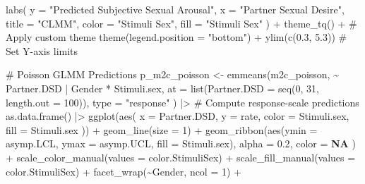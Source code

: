 \documentclass[
  bookmarksnumbered]{article}
\newenvironment{Shaded}{\begin{snugshade}}{\end{snugshade}}
\newcommand{\AttributeTok}[1]{\textcolor[rgb]{0.80,0.80,0.80}{#1}}
\newcommand{\CommentTok}[1]{\textcolor[rgb]{0.50,0.62,0.50}{#1}}
\newcommand{\ConstantTok}[1]{\textcolor[rgb]{0.86,0.64,0.64}{\textbf{#1}}}
\newcommand{\DecValTok}[1]{\textcolor[rgb]{0.86,0.86,0.80}{#1}}
\newcommand{\FloatTok}[1]{\textcolor[rgb]{0.75,0.75,0.82}{#1}}
\newcommand{\FunctionTok}[1]{\textcolor[rgb]{0.94,0.94,0.56}{#1}}
\newcommand{\NormalTok}[1]{\textcolor[rgb]{0.80,0.80,0.80}{#1}}
\newcommand{\OtherTok}[1]{\textcolor[rgb]{0.94,0.94,0.56}{#1}}
\newcommand{\SpecialCharTok}[1]{\textcolor[rgb]{0.86,0.64,0.64}{#1}}
\newcommand{\StringTok}[1]{\textcolor[rgb]{0.80,0.58,0.58}{#1}}
\begin{document}
\begin{Shaded}
\begin{Highlighting}[]
  \FunctionTok{labs}\NormalTok{(}
    \AttributeTok{y =} \StringTok{"Predicted Subjective Sexual Arousal"}\NormalTok{, }\AttributeTok{x =} \StringTok{"Partner Sexual Desire"}\NormalTok{,}
    \AttributeTok{title =} \StringTok{"CLMM"}\NormalTok{,}
    \AttributeTok{color =} \StringTok{"Stimuli Sex"}\NormalTok{, }\AttributeTok{fill =} \StringTok{"Stimuli Sex"}
\NormalTok{  ) }\SpecialCharTok{+}
  \FunctionTok{theme\_tq}\NormalTok{() }\SpecialCharTok{+} \CommentTok{\# Apply custom theme}
  \FunctionTok{theme}\NormalTok{(}\AttributeTok{legend.position =} \StringTok{"bottom"}\NormalTok{) }\SpecialCharTok{+}
  \FunctionTok{ylim}\NormalTok{(}\FunctionTok{c}\NormalTok{(}\FloatTok{0.3}\NormalTok{, }\FloatTok{5.3}\NormalTok{)) }\CommentTok{\# Set Y{-}axis limits}

\CommentTok{\# Poisson GLMM Predictions}
\NormalTok{p\_m2c\_poisson }\OtherTok{\textless{}{-}} \FunctionTok{emmeans}\NormalTok{(m2c\_poisson, }\SpecialCharTok{\textasciitilde{}}\NormalTok{ Partner.DSD }\SpecialCharTok{|}\NormalTok{ Gender }\SpecialCharTok{*}\NormalTok{ Stimuli.sex,}
  \AttributeTok{at =} \FunctionTok{list}\NormalTok{(}\AttributeTok{Partner.DSD =} \FunctionTok{seq}\NormalTok{(}\DecValTok{0}\NormalTok{, }\DecValTok{31}\NormalTok{, }\AttributeTok{length.out =} \DecValTok{100}\NormalTok{)),}
  \AttributeTok{type =} \StringTok{"response"}
\NormalTok{) }\SpecialCharTok{|\textgreater{}} \CommentTok{\# Compute response{-}scale predictions}
  \FunctionTok{as.data.frame}\NormalTok{() }\SpecialCharTok{|\textgreater{}}
  \FunctionTok{ggplot}\NormalTok{(}\FunctionTok{aes}\NormalTok{(}
    \AttributeTok{x =}\NormalTok{ Partner.DSD, }\AttributeTok{y =}\NormalTok{ rate,}
    \AttributeTok{color =}\NormalTok{ Stimuli.sex, }\AttributeTok{fill =}\NormalTok{ Stimuli.sex}
\NormalTok{  )) }\SpecialCharTok{+}
  \FunctionTok{geom\_line}\NormalTok{(}\AttributeTok{size =} \DecValTok{1}\NormalTok{) }\SpecialCharTok{+}
  \FunctionTok{geom\_ribbon}\NormalTok{(}\FunctionTok{aes}\NormalTok{(}\AttributeTok{ymin =}\NormalTok{ asymp.LCL, }\AttributeTok{ymax =}\NormalTok{ asymp.UCL, }\AttributeTok{fill =}\NormalTok{ Stimuli.sex),}
    \AttributeTok{alpha =} \FloatTok{0.2}\NormalTok{, }\AttributeTok{color =} \ConstantTok{NA}
\NormalTok{  ) }\SpecialCharTok{+}
  \FunctionTok{scale\_color\_manual}\NormalTok{(}\AttributeTok{values =}\NormalTok{ color.StimuliSex) }\SpecialCharTok{+}
  \FunctionTok{scale\_fill\_manual}\NormalTok{(}\AttributeTok{values =}\NormalTok{ color.StimuliSex) }\SpecialCharTok{+}
  \FunctionTok{facet\_wrap}\NormalTok{(}\SpecialCharTok{\textasciitilde{}}\NormalTok{Gender, }\AttributeTok{ncol =} \DecValTok{1}\NormalTok{) }\SpecialCharTok{+}

\end{Highlighting}
\end{Shaded}
\end{document}
